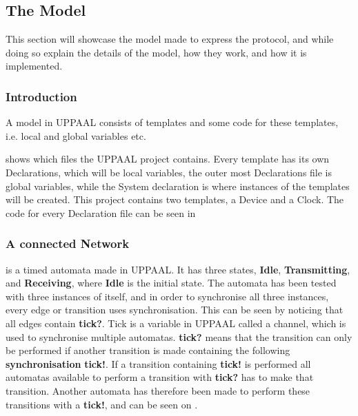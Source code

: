 \subsection{The Model}
This section will showcase the model made to express the protocol, and while doing so explain the details of the model, how they work, and how it is implemented.

\subsubsection{Introduction}
A model in UPPAAL consists of templates and some code for these templates, i.e. local and global variables etc.


 shows which files the UPPAAL project contains. 
Every template has its own Declarations, which will be local variables, the outer most Declarations file is global variables, while the System declaration is where instances of the templates will be created.
This project contains two templates, a Device and a Clock.
The code for every Declaration file can be seen in 

\subsubsection{A connected Network}

 is a timed automata made in UPPAAL.
It has three states, \textbf{Idle}, \textbf{Transmitting}, and \textbf{Receiving}, where \textbf{Idle} is the initial state.
The automata has been tested with three instances of itself, and in order to synchronise all three instances, every edge or transition uses synchronisation.
This can be seen by noticing that all edges contain \textbf{tick?}. 
Tick is a variable in UPPAAL called a channel, which is used to synchronise multiple automatas.
\textbf{tick?} means that the transition can only be performed if another transition is made containing the following \textbf{synchronisation} \textbf{tick!}.
If a transition containing \textbf{tick!} is performed all automatas available to perform a transition with \textbf{tick?} has to make that transition.
Another automata has therefore been made to perform these transitions with a \textbf{tick!}, and can be seen on .

